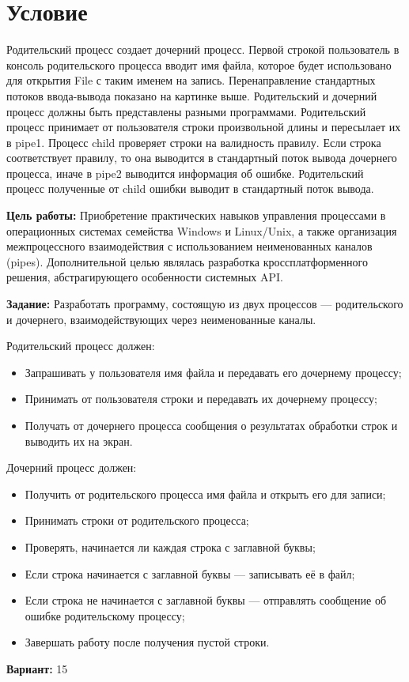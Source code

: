 \section{Условие}
Родительский процесс создает дочерний процесс. Первой строкой пользователь в консоль
родительского процесса вводит имя файла, которое будет использовано для открытия File с таким
именем на запись. Перенаправление стандартных потоков ввода-вывода показано на картинке
выше. Родительский и дочерний процесс должны быть представлены разными программами.
Родительский процесс принимает от пользователя строки произвольной длины и пересылает их в
pipe1. Процесс child проверяет строки на валидность правилу. Если строка соответствует правилу,
то она выводится в стандартный поток вывода дочернего процесса, иначе в pipe2 выводится
информация об ошибке. Родительский процесс полученные от child ошибки выводит в
стандартный поток вывода.

{\bfseries Цель работы:} Приобретение практических навыков управления процессами в операционных системах семейства Windows и Linux/Unix, а также организация межпроцессного взаимодействия с использованием неименованных каналов (pipes). Дополнительной целью являлась разработка кроссплатформенного решения, абстрагирующего особенности системных API.

{\bfseries Задание:} Разработать программу, состоящую из двух процессов — родительского и дочернего, взаимодействующих через неименованные каналы.

Родительский процесс должен:
\begin{itemize}
    \item Запрашивать у пользователя имя файла и передавать его дочернему процессу;
    \item Принимать от пользователя строки и передавать их дочернему процессу;
    \item Получать от дочернего процесса сообщения о результатах обработки строк и выводить их на экран.
\end{itemize}

Дочерний процесс должен:
\begin{itemize}
    \item Получить от родительского процесса имя файла и открыть его для записи;
    \item Принимать строки от родительского процесса;
    \item Проверять, начинается ли каждая строка с заглавной буквы;
    \item Если строка начинается с заглавной буквы — записывать её в файл;
    \item Если строка не начинается с заглавной буквы — отправлять сообщение об ошибке родительскому процессу;
    \item Завершать работу после получения пустой строки.
\end{itemize}

{\bfseries Вариант:} 15


